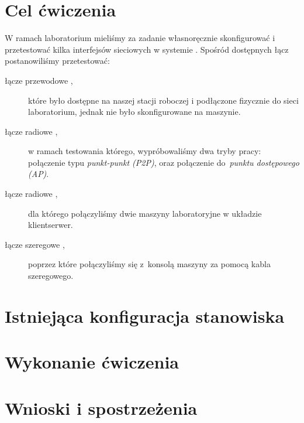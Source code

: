 \documentclass[a4paper,11pt,notitlepage]{article}
\begin{document}

\maketitle
\tableofcontents


\section{Cel ćwiczenia}

W ramach laboratorium mieliśmy za zadanie własnoręcznie skonfigurować i
przetestować kilka interfejsów sieciowych w systemie \bsd. Spośród dostępnych
łącz postanowiliśmy przetestować:

\begin{description}
    \item[łącze przewodowe \eth\textnormal{,}] które było dostępne na naszej
    stacji roboczej i podłączone fizycznie do sieci laboratorium, jednak nie
    było skonfigurowane na maszynie.
    \item[łącze radiowe \wifi\textnormal{,}] w ramach testowania którego,
    wypróbowaliśmy dwa tryby pracy: połączenie typu \emph{punkt-punkt (P2P)},
    oraz połączenie do~\emph{punktu dostępowego (AP)}.
    \item[łącze radiowe \bt\textnormal{,}] dla którego połączyliśmy dwie
    maszyny laboratoryjne w układzie klient\dywiz serwer.
    \item[łącze szeregowe \uart\textnormal{,}] poprzez które połączyliśmy się
    z~konsolą maszyny \zielone{} za pomocą kabla szeregowego.
\end{description}


\section{Istniejąca konfiguracja stanowiska}


\section{Wykonanie ćwiczenia}




\section{Wnioski i spostrzeżenia}
\end{document}
